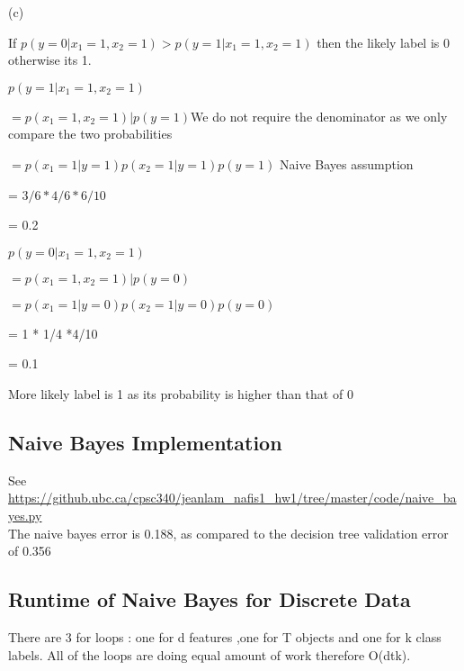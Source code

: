 \documentclass{article}
\def\blu#1{{\color{blu}#1}}
\def\gre#1{{\color{gre}#1}}
\def\red#1{{\color{red}#1}}
\begin{document}
(c)

If $p(y = 0|x_1 = 1, x_2 = 1) > p(y = 1|x_1 = 1, x_2 = 1)$ then the likely label is 0 otherwise its 1.

\blu {$p(y = 1|x_1 = 1, x_2 = 1)$}

\gre{$=p(x_1 = 1, x_2 = 1)|p(y=1)$}\red{We do not require the denominator as we only compare the two probabilities }

\gre{$=p(x_1=1|y=1)p(x_2 = 1|y=1)p(y=1)$} \red {Naive Bayes assumption}

\gre{= $3/6*4/6*6/10$}

\gre{= 0.2}

\blu{$p(y = 0|x_1 = 1, x_2 = 1)$}

\gre{$=p(x_1 = 1, x_2 = 1)|p(y=0)$}

\gre{$=p(x_1=1|y=0)p(x_2 = 1|y=0)p(y=0)$}

\gre{= 1 * 1/4 *4/10}

\gre{= 0.1}

\gre{More likely label is 1 as its probability is higher than that of 0} 
\subsection{Naive Bayes Implementation}
See \url{https://github.ubc.ca/cpsc340/jeanlam_nafis1_hw1/tree/master/code/naive_bayes.py} \\
The naive bayes error is 0.188, as compared to the decision tree validation error of 0.356
\subsection{Runtime of Naive Bayes for Discrete Data}

\gre{There are 3 for loops : one for d features ,one for T objects and one for k class labels.  All of the loops are doing equal amount of work therefore O(dtk).}
 
\end{document}
